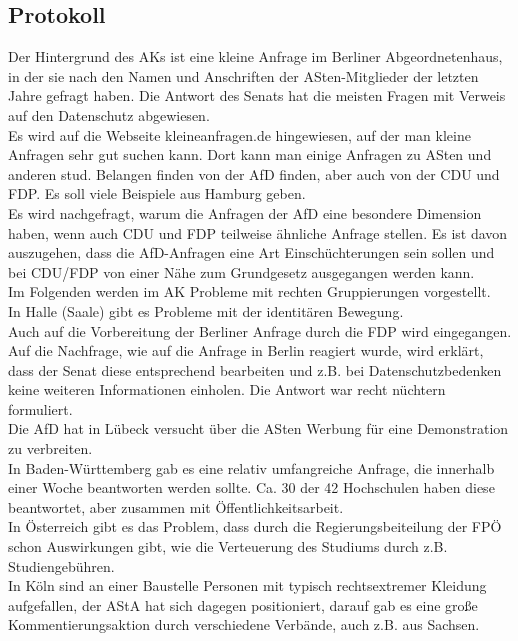   \subsection*{Protokoll}
Der Hintergrund des AKs ist eine kleine Anfrage im Berliner Abgeordnetenhaus, in der sie nach den Namen und Anschriften der ASten-Mitglieder der letzten Jahre gefragt haben. Die Antwort des Senats hat die meisten Fragen mit Verweis auf den Datenschutz abgewiesen. \\
Es wird auf die Webseite kleineanfragen.de hingewiesen, auf der man kleine Anfragen sehr gut suchen kann. Dort kann man einige Anfragen zu ASten und anderen stud. Belangen finden von der AfD finden, aber auch von der CDU und FDP. Es soll viele Beispiele aus Hamburg geben. \\
Es wird nachgefragt, warum die Anfragen der AfD eine besondere Dimension haben, wenn auch CDU und FDP teilweise ähnliche Anfrage stellen. Es ist davon auszugehen, dass die AfD-Anfragen eine Art Einschüchterungen sein sollen und bei CDU/FDP von einer Nähe zum Grundgesetz ausgegangen werden kann. \\
Im Folgenden werden im AK Probleme mit rechten Gruppierungen vorgestellt. \\
In Halle (Saale) gibt es Probleme mit der identitären Bewegung. \\
Auch auf die Vorbereitung der Berliner Anfrage durch die FDP wird eingegangen. \\
Auf die Nachfrage, wie auf die Anfrage in Berlin reagiert wurde, wird erklärt, dass der Senat diese entsprechend bearbeiten und z.B. bei Datenschutzbedenken keine weiteren Informationen einholen. Die Antwort war recht nüchtern formuliert. \\
Die AfD hat in Lübeck versucht über die ASten Werbung für eine Demonstration zu verbreiten. \\
In Baden-Württemberg gab es eine relativ umfangreiche Anfrage, die innerhalb einer Woche beantworten werden sollte. Ca. 30 der 42 Hochschulen haben diese beantwortet, aber zusammen mit Öffentlichkeitsarbeit. \\
In Österreich gibt es das Problem, dass durch die Regierungsbeiteilung der FPÖ schon Auswirkungen gibt, wie die Verteuerung des Studiums durch z.B. Studiengebühren. \\
In Köln sind an einer Baustelle Personen mit typisch rechtsextremer Kleidung aufgefallen, der AStA hat sich dagegen positioniert, darauf gab es eine große Kommentierungsaktion durch verschiedene Verbände, auch z.B. aus Sachsen.\\
